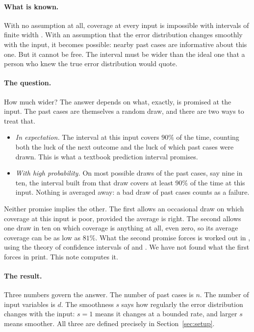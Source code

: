 \documentclass[11pt]{article}
\theoremstyle{definition}
\theoremstyle{remark}
\begin{document}
\paragraph{What is known.}
With no assumption at all, coverage at every input is impossible with intervals of finite
width \citep{vovk2012conditional,lei2014distribution,barber2021limits}. With an assumption
that the error distribution changes smoothly with the input, it becomes possible: nearby
past cases are informative about this one. But it cannot be free. The interval must be
wider than the ideal one that a person who knew the true error distribution would quote.

\paragraph{The question.}
How much wider? The answer depends on what, exactly, is promised at the input. The past
cases are themselves a random draw, and there are two ways to treat that.
\begin{itemize}
\item \emph{In expectation.} The interval at this input covers $90\%$ of the time, counting
  both the luck of the next outcome and the luck of which past cases were drawn. This is what
  a textbook prediction interval promises.
\item \emph{With high probability.} On most possible draws of the past cases, say nine in ten,
  the interval built from that draw covers at least $90\%$ of the time at this input.
  Nothing is averaged away: a bad draw of past cases counts as a failure.
\end{itemize}
Neither promise implies the other. The first allows an occasional draw on which coverage at
this input is poor, provided the average is right. The second allows one draw in ten on
which coverage is anything at all, even zero, so its average coverage can be as low as
$81\%$. What the second promise forces is worked out in \citet{cotton2026honest}, using
the theory of confidence intervals of \citet{low1997nonparametric} and
\citet{cai2004adaptation}. We have not found what the first forces in print. This note computes it.

\paragraph{The result.}
Three numbers govern the answer. The number of past cases is $n$. The number of input
variables is $d$. The smoothness $s$ says how regularly the error distribution changes with
the input: $s=1$ means it changes at a bounded rate, and larger $s$ means smoother. All
three are defined precisely in Section~\ref{sec:setup}.
\end{document}
